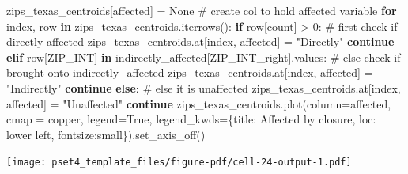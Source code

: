 \documentclass[
  letterpaper,
  DIV=11,
  numbers=noendperiod]{scrartcl}
\newenvironment{Shaded}{\begin{snugshade}}{\end{snugshade}}
\newcommand{\CommentTok}[1]{\textcolor[rgb]{0.37,0.37,0.37}{#1}}
\newcommand{\ControlFlowTok}[1]{\textcolor[rgb]{0.00,0.23,0.31}{\textbf{#1}}}
\newcommand{\DecValTok}[1]{\textcolor[rgb]{0.68,0.00,0.00}{#1}}
\newcommand{\KeywordTok}[1]{\textcolor[rgb]{0.00,0.23,0.31}{\textbf{#1}}}
\newcommand{\NormalTok}[1]{\textcolor[rgb]{0.00,0.23,0.31}{#1}}
\newcommand{\OperatorTok}[1]{\textcolor[rgb]{0.37,0.37,0.37}{#1}}
\newcommand{\StringTok}[1]{\textcolor[rgb]{0.13,0.47,0.30}{#1}}
\newcommand{\VariableTok}[1]{\textcolor[rgb]{0.07,0.07,0.07}{#1}}
\begin{document}
\begin{Shaded}
\begin{Highlighting}[]
\NormalTok{zips\_texas\_centroids[}\StringTok{\textquotesingle{}affected\textquotesingle{}}\NormalTok{] }\OperatorTok{=} \VariableTok{None} \CommentTok{\# create col to hold affected variable}
\ControlFlowTok{for}\NormalTok{ index, row }\KeywordTok{in}\NormalTok{ zips\_texas\_centroids.iterrows():}
    \ControlFlowTok{if}\NormalTok{ row[}\StringTok{\textquotesingle{}count\textquotesingle{}}\NormalTok{] }\OperatorTok{\textgreater{}} \DecValTok{0}\NormalTok{: }\CommentTok{\# first check if directly affected}
\NormalTok{        zips\_texas\_centroids.at[index, }\StringTok{\textquotesingle{}affected\textquotesingle{}}\NormalTok{] }\OperatorTok{=} \StringTok{"Directly"}
        \ControlFlowTok{continue}
    \ControlFlowTok{elif}\NormalTok{ row[}\StringTok{\textquotesingle{}ZIP\_INT\textquotesingle{}}\NormalTok{] }\KeywordTok{in}\NormalTok{ indirectly\_affected[}\StringTok{\textquotesingle{}ZIP\_INT\_right\textquotesingle{}}\NormalTok{].values: }\CommentTok{\# else check if brought onto indirectly\_affected}
\NormalTok{        zips\_texas\_centroids.at[index, }\StringTok{\textquotesingle{}affected\textquotesingle{}}\NormalTok{] }\OperatorTok{=} \StringTok{"Indirectly"}
        \ControlFlowTok{continue}
    \ControlFlowTok{else}\NormalTok{: }\CommentTok{\# else it is unaffected}
\NormalTok{        zips\_texas\_centroids.at[index, }\StringTok{\textquotesingle{}affected\textquotesingle{}}\NormalTok{] }\OperatorTok{=} \StringTok{"Unaffected"}
        \ControlFlowTok{continue}
\NormalTok{zips\_texas\_centroids.plot(column}\OperatorTok{=}\StringTok{\textquotesingle{}affected\textquotesingle{}}\NormalTok{, cmap }\OperatorTok{=} \StringTok{\textquotesingle{}copper\textquotesingle{}}\NormalTok{, legend}\OperatorTok{=}\VariableTok{True}\NormalTok{, legend\_kwds}\OperatorTok{=}\NormalTok{\{}\StringTok{\textquotesingle{}title\textquotesingle{}}\NormalTok{: }\StringTok{\textquotesingle{}Affected by closure\textquotesingle{}}\NormalTok{, }\StringTok{\textquotesingle{}loc\textquotesingle{}}\NormalTok{: }\StringTok{\textquotesingle{}lower left\textquotesingle{}}\NormalTok{, }\StringTok{\textquotesingle{}fontsize\textquotesingle{}}\NormalTok{:}\StringTok{\textquotesingle{}small\textquotesingle{}}\NormalTok{\}).set\_axis\_off()}
\end{Highlighting}
\end{Shaded}

\texttt{[image: pset4\_template\_files/figure-pdf/cell-24-output-1.pdf]}
\end{document}
